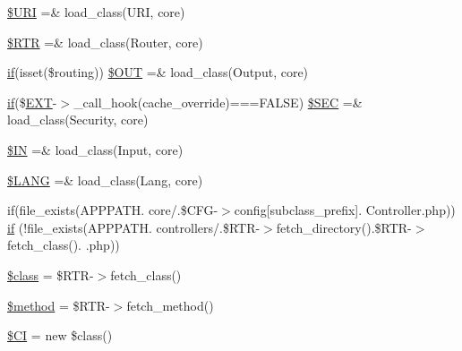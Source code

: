 \begin{DoxyCompactItemize}
\item 
\hyperlink{_code_igniter_8php_a630d83d898b39ad4568906284f7f5336}{\$\+U\+RI} =\& load\+\_\+class(\textquotesingle{}U\+RI\textquotesingle{}, \textquotesingle{}core\textquotesingle{})
\item 
\hyperlink{_code_igniter_8php_a4d6c9285c8483e4708a57a4128fc95f3}{\$\+R\+TR} =\& load\+\_\+class(\textquotesingle{}Router\textquotesingle{}, \textquotesingle{}core\textquotesingle{})
\item 
\hyperlink{jquery_8tokeninput_8js_ad8dd46a3cbc004569e34401e9e71771a}{if}(isset(\$routing)) \hyperlink{_code_igniter_8php_a3f9ee241bf32c302b003449e028c859b}{\$\+O\+UT} =\& load\+\_\+class(\textquotesingle{}Output\textquotesingle{}, \textquotesingle{}core\textquotesingle{})
\item 
\hyperlink{jquery_8tokeninput_8js_ad8dd46a3cbc004569e34401e9e71771a}{if}(\$\hyperlink{vendors_2tinymce_2plugins_2jbimages_2ci_2index_8php_ad48706cc82e010be85f1398fb34c6510}{E\+XT}-\/$>$\+\_\+call\+\_\+hook(\textquotesingle{}cache\+\_\+override\textquotesingle{})===F\+A\+L\+SE) \hyperlink{_code_igniter_8php_ad1366cae5e96fdde83a2fd6053334acd}{\$\+S\+EC} =\& load\+\_\+class(\textquotesingle{}Security\textquotesingle{}, \textquotesingle{}core\textquotesingle{})
\item 
\hyperlink{_code_igniter_8php_a66d076d48aff75a01bb726f5bdd94d46}{\$\+IN} =\& load\+\_\+class(\textquotesingle{}Input\textquotesingle{}, \textquotesingle{}core\textquotesingle{})
\item 
\hyperlink{_code_igniter_8php_afab4eb732acc05cebf41e0afce18681c}{\$\+L\+A\+NG} =\& load\+\_\+class(\textquotesingle{}Lang\textquotesingle{}, \textquotesingle{}core\textquotesingle{})
\item 
if(file\+\_\+exists(A\+P\+P\+P\+A\+T\+H. \textquotesingle{}core/\textquotesingle{}.\$C\+FG-\/$>$config\mbox{[}\textquotesingle{}subclass\+\_\+prefix\textquotesingle{}\mbox{]}. \textquotesingle{}Controller.\+php\textquotesingle{})) \hyperlink{_code_igniter_8php_acb2d2139729c1fd003d2184b034d9cf9}{if} (!file\+\_\+exists(A\+P\+P\+P\+A\+T\+H. \textquotesingle{}controllers/\textquotesingle{}.\$R\+TR-\/$>$fetch\+\_\+directory().\$R\+TR-\/$>$fetch\+\_\+class(). \textquotesingle{}.php\textquotesingle{}))
\item 
\hyperlink{_code_igniter_8php_a252ba022809910ea710a068fc1bab657}{\$class} = \$R\+TR-\/$>$fetch\+\_\+class()
\item 
\hyperlink{_code_igniter_8php_a12661b2fc0f57f97e30a1620889ce9c6}{\$method} = \$R\+TR-\/$>$fetch\+\_\+method()
\item 
\hyperlink{_code_igniter_8php_ae0314d046ddf7fcfaec03222977427d3}{\$\+CI} = new \$class()
\end{DoxyCompactItemize}


